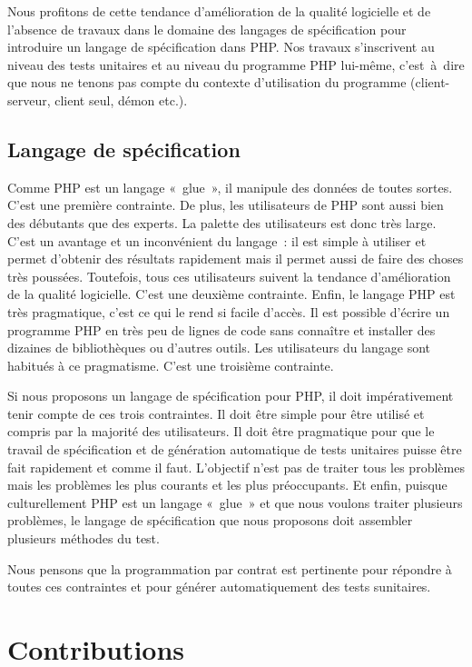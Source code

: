 Nous profitons de cette tendance d'amélioration de la qualité logicielle et de
l'absence de travaux dans le domaine des langages de spécification pour
introduire un langage de spécification dans PHP. Nos travaux s'inscrivent au
niveau des tests unitaires et au niveau du programme PHP lui-même, c'est~à~dire
que nous ne tenons pas compte du contexte d'utilisation du programme
(client-serveur, client seul, démon etc.).

\subsection{Langage de spécification}

Comme PHP est un langage «~glue~», il manipule des données de toutes sortes.
C'est une première contrainte. De plus, les utilisateurs de PHP sont aussi bien
des débutants que des experts. La palette des utilisateurs est donc très large.
C'est un avantage et un inconvénient du langage~: il est simple à utiliser et
permet d'obtenir des résultats rapidement mais il permet aussi de faire des
choses très poussées. Toutefois, tous ces utilisateurs suivent la tendance
d'amélioration de la qualité logicielle. C'est une deuxième contrainte. Enfin,
le langage PHP est très pragmatique, c'est ce qui le rend si facile d'accès. Il
est possible d'écrire un programme PHP en très peu de lignes de code sans
connaître et installer des dizaines de bibliothèques ou d'autres outils. Les
utilisateurs du langage sont habitués à ce pragmatisme. C'est une troisième
contrainte.

Si nous proposons un langage de spécification pour PHP, il doit impérativement
tenir compte de ces trois contraintes. Il doit être simple pour être utilisé et
compris par la majorité des utilisateurs. Il doit être pragmatique pour que le
travail de spécification et de génération automatique de tests unitaires puisse
être fait rapidement et comme il faut. L'objectif n'est pas de traiter tous les
problèmes mais les problèmes les plus courants et les plus préoccupants. Et
enfin, puisque culturellement PHP est un langage «~glue~» et que nous voulons
traiter plusieurs problèmes, le langage de spécification que nous proposons doit
assembler plusieurs méthodes du test.

Nous pensons que la programmation par contrat est pertinente pour répondre à
toutes ces contraintes et pour générer automatiquement des tests sunitaires.

\section{Contributions}
\label{section:introduction:contributions}

